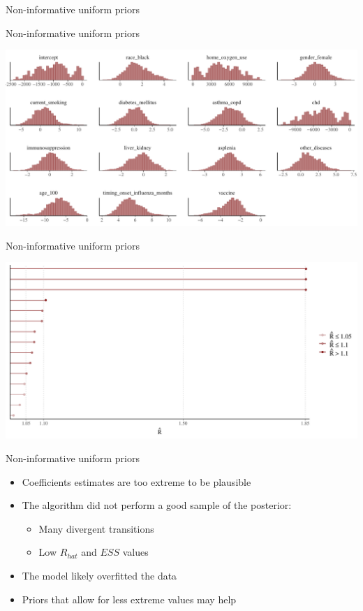 \documentclass[ignorenonframetext,a4paper]{beamer}
\providecommand{\tightlist}{%
  \setlength{\itemsep}{0pt}\setlength{\parskip}{0pt}}
\begin{document}
\begin{frame}{Non-informative uniform priors}

\end{frame}

\begin{frame}{Non-informative uniform priors}

\includegraphics{DB_presentation_case_study_files/figure-beamer/unnamed-chunk-27-1.pdf}

\end{frame}

\begin{frame}{Non-informative uniform priors}

\includegraphics{DB_presentation_case_study_files/figure-beamer/unnamed-chunk-28-1.pdf}

\end{frame}

\begin{frame}{Non-informative uniform priors}

\begin{itemize}
\item
  Coefficients estimates are too extreme to be plausible
\item
  The algorithm did not perform a good sample of the posterior:

  \begin{itemize}
  \tightlist
  \item
    Many divergent transitions
  \item
    Low \(R_{hat}\) and \(ESS\) values
  \end{itemize}
\item
  The model likely overfitted the data
\item
  Priors that allow for less extreme values may help
\end{itemize}

\end{frame}
\end{document}

